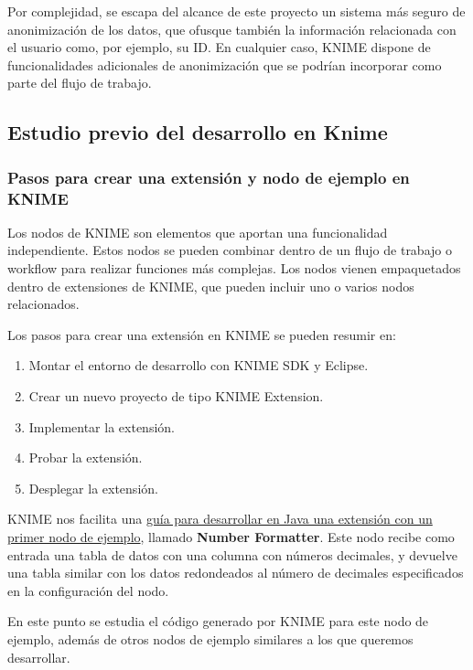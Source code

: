 Por complejidad, se escapa del alcance de este proyecto un sistema más seguro de anonimización de los datos, que ofusque 
también la información relacionada con el usuario como, por ejemplo, su ID. En cualquier caso, KNIME dispone de funcionalidades
adicionales de anonimización que se podrían incorporar como parte del flujo de trabajo. 


\subsection{Estudio previo del desarrollo en Knime}

\subsubsection{Pasos para crear una extensión y nodo de ejemplo en KNIME}

Los nodos de KNIME son elementos que aportan una funcionalidad independiente. Estos nodos se pueden combinar dentro de un 
flujo de trabajo o workflow para realizar funciones más complejas. Los nodos vienen empaquetados dentro de extensiones de KNIME, que 
pueden incluir uno o varios nodos relacionados. 
\

Los pasos para crear una extensión en KNIME se pueden resumir en: 

\begin{enumerate}
	\item Montar el entorno de desarrollo con KNIME SDK y Eclipse.
	\item Crear un nuevo proyecto de tipo KNIME Extension. 
	\item Implementar la extensión. 
	\item Probar la extensión. 
	\item Desplegar la extensión. 
\end{enumerate}

KNIME nos facilita una \href{https://docs.knime.com/latest/analytics_platform_new_node_quickstart_guide/index.html#_introduction}{guía 
para desarrollar en Java una extensión con un primer nodo de ejemplo}, llamado \textbf{Number Formatter}. Este nodo recibe como entrada 
una tabla de datos con una columna con números decimales, y devuelve una tabla similar con los datos redondeados al número 
de decimales especificados en la configuración del nodo. 
\

En este punto se estudia el código generado por KNIME para este nodo de ejemplo, además de otros nodos de ejemplo similares 
a los que queremos desarrollar. 



